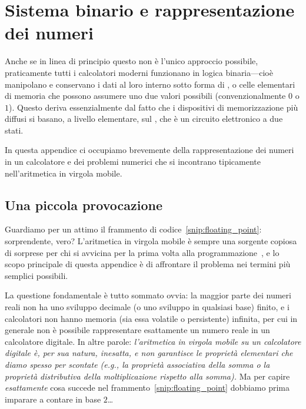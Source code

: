 \chapter{Sistema binario e rappresentazione dei numeri}
\label{sec:sistema_binario}

Anche se in linea di principio questo non è l'unico approccio possibile,
praticamente tutti i calcolatori moderni funzionano in logica binaria---cioè
manipolano e conservano i dati al loro interno sotto forma di , o celle
elementari di memoria che possono assumere uno due valori possibili
(convenzionalmente $0$ o $1$). Questo deriva essenzialmente dal fatto che i
dispositivi di memorizzazione più diffusi si basano, a livello elementare, sul
, che è un circuito elettronico a due stati.

In questa appendice ci occupiamo brevemente della rappresentazione dei numeri
in un calcolatore e dei problemi numerici che si incontrano tipicamente
nell'aritmetica in virgola mobile.


\section{Una piccola provocazione}

Guardiamo per un attimo il frammento di codice~\ref{snip:floating_point}:
sorprendente, vero? L'aritmetica in virgola mobile è sempre una sorgente copiosa di
sorprese per chi si avvicina per la prima volta alla
programmazione~\cite{python_floating_point, bush_floating_point}, e lo scopo
principale di questa appendice è di affrontare il problema nei termini più
semplici possibili.


La questione fondamentale è tutto sommato ovvia: la maggior parte dei numeri
reali non ha uno sviluppo decimale (o uno sviluppo in qualsiasi base) finito,
e i calcolatori non hanno memoria (sia essa volatile o persistente) infinita,
per cui in generale non è possibile rappresentare esattamente un numero reale
in un calcolatore digitale. In altre parole:
\emph{l'aritmetica in virgola mobile su un calcolatore digitale è, per sua
natura, inesatta, e non garantisce le proprietà elementari che diamo spesso
per scontate (e.g., la proprietà associativa della somma o la proprietà
distributiva della moltiplicazione rispetto alla somma).}
Ma per capire \emph{esattamente} cosa succede nel frammento~\ref{snip:floating_point}
dobbiamo prima imparare a contare in base $2$\ldots


